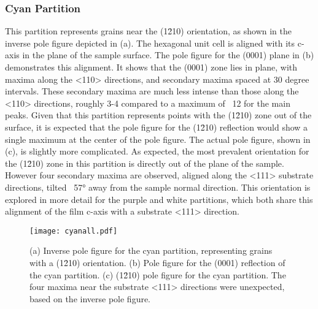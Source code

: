 \subsubsection{Cyan Partition}
\label{subsubsec:single.growth.cyan}



%
%
			
This partition represents grains near  the (1\={2}10) orientation, as shown in the inverse
pole figure depicted in (a). The hexagonal unit cell is aligned with
its c-axis in the plane of the sample surface. The pole figure for the (0001) plane in
(b) demonstrates this alignment. It shows that the (0001) zone lies in
plane, with maxima along the <110> directions, and secondary maxima spaced at 30 degree
intervals. These secondary maxima are much less intense than those along the <110> directions, roughly 3-4  compared to a maximum of ~12 for the main peaks.
Given that this partition represents points with the (1\={2}10) zone out of the surface,
it is expected that the pole figure for the (1\={2}10) reflection would show a single
maximum at the center of the pole figure. The actual pole figure, shown in
(c), is slightly more complicated. As expected, the most prevalent
orientation for the (1\={2}10) zone in this partition is directly out of the plane of the
sample. However four secondary maxima are observed, aligned along the <111> substrate
directions, tilted ~57\si{\degree} away from the sample normal direction. This orientation
is explored in more detail for the purple and white partitions, which both share this
alignment of the film c-axis with a substrate <111> direction.
\begin{figure}
	\texttt{[image: cyanall.pdf]}
		\caption[Pole figure for cyan partition]{%
			(a) Inverse pole figure for the cyan partition, representing grains with 
	a (1\={2}10) orientation. (b) Pole figure for the (0001) reflection of the cyan
partition. (c) (1\={2}10) pole figure for the cyan partition. The four maxima near 
	the substrate <111> directions were unexpected, based on the inverse 
	pole figure.}
	\label{fig:cyanall}
\end{figure}
